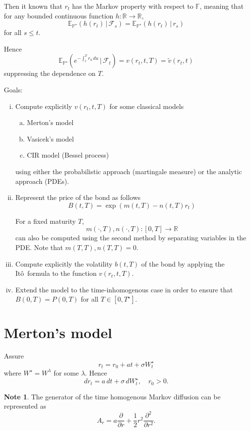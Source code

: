 \documentclass[10pt, oneside, reqno]{amsbook}
\theoremstyle{plain}%
\theoremstyle{definition}
\theoremstyle{rem}
\newtheorem*{note}{Note}
\theoremstyle{definition}
\def \P {\ensuremath{\mathcal{P}}}
\newcommand{\given}{ \, | \,}
\newcommand{\sigf}{\mathcal{F}}
\newcommand{\R}{\mathbb{R}}
\newcommand{\E}{\mathbb{E}}
\renewcommand{\P}{\mathbb{P}}
\newcommand{\F}{\mathbb{F}}
\newcommand{\ito}{It\^o\ }
\numberwithin{equation}{chapter}
\begin{document}
    Then it known that $r_t$ has the Markov property with respect to $\F$, meaning that for any bounded continuous function $h : \R \rightarrow \R$, \[
    \E_{\P^\star} \left(h(r_t) \given \sigf_s \right) = \E_{\P^\star}\left(h(r_t) \given r_s \right)
 \] for all $s \leq t$.   

Hence \[
    \E_{\P^\star} \left(e^{-\int_t^T r_u \, du} \given \sigf_t \right) = v(r_t, t, T) = \tilde v(r_t, t) 
\] suppressing the dependence on $T$.

Goals:
\begin{enumerate}[(i)]
    \item Compute explicitly $v(r_t, t, T)$ for some classical models \begin{enumerate}[(a)]
        \item Merton's model 
        \item Vasicek's model
        \item CIR model (Bessel process)
    \end{enumerate}
    using either the probabilistic approach (martingale measure) or the  analytic approach (PDEs).
    \item Represent the price of the bond as follows \[
        B(t, T) = \exp \left( m(t, T) - n(t, T) r_t \right)
    \]
    
    For a fixed maturity $T$, \[
        m(\cdot, T), n(\cdot, T) : [0, T] \rightarrow \R
    \] can also be computed using the second method by separating variables in the PDE.  Note that $m(T, T), n(T, T) = 0$.
    \item Compute explicitly the volatility $b(t, T)$ of the bond by applying the \ito formula to the function $v(r_t, t, T)$.
    \item Extend the model to the time-inhomogenous case in order to ensure that $B(0, T) = P(0, T)$ for all $T \in [0, T^\star]$.
\end{enumerate}

\section{Merton's model} %
\label{sub:merton_s_model}
    Assure \[
        r_t = r_0 + at + \sigma W_t^\star 
    \] where $W^\star = W^\lambda$ for some $\lambda$.  Hence
    \begin{equation}
        dr_t = a \, dt + \sigma \, dW^\star_t, \quad r_0 > 0.
    \end{equation} 
    \begin{note}
        The generator of the time homogenous Markov diffusion can be represented as \[
            A_r = a \frac{\partial }{\partial r} + \frac{1}{2} r^2 \frac{\partial^2}{\partial r^2}.  
        \]
    \end{note}
\end{document}
